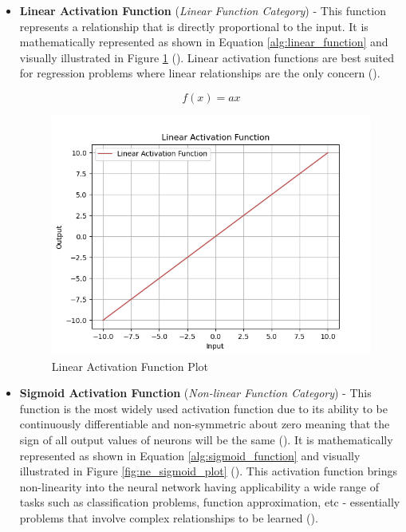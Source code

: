 \begin{itemize}
    \item \textbf{Linear Activation Function} (\textit{Linear Function Category}) - This function represents a relationship that is directly proportional to the input. It is mathematically represented as shown in Equation \ref{alg:linear_function} and visually illustrated in Figure \ref{fig:ne_linear_plot} (\cite{sharma2017activation}). Linear activation functions are best suited for regression problems where linear relationships are the only concern (\cite{sharma2017activation}).
    
    \begin{equation}\label{alg:linear_function}
        f(x) = ax
    \end{equation}

    \begin{figure}[H] %
        \centering %
        \includegraphics[width=\textwidth]{Figures/chapter_ne/ne_linear_plot.png} %
        \caption{Linear Activation Function Plot}
        \label{fig:ne_linear_plot} %
    \end{figure}

    \item \textbf{Sigmoid Activation Function} (\textit{Non-linear Function Category}) - This function is the most widely used activation function due to its ability to be continuously differentiable and non-symmetric about zero meaning that the sign of all output values of neurons will be the same (\cite{sharma2017activation}). It is mathematically represented as shown in Equation \ref{alg:sigmoid_function} and visually illustrated in Figure \ref{fig:ne_sigmoid_plot} (\cite{sharma2017activation}). This activation function brings non-linearity into the neural network having applicability a wide range of tasks such as classification problems, function approximation, etc - essentially problems that involve complex relationships to be learned (\cite{sharma2017activation}).
    

\end{itemize}
